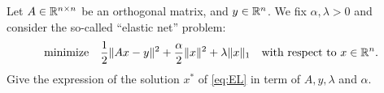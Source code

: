 \documentclass[11pt,nocut]{article}
\begin{document}
\vspace{4mm}

\begin{problem}[$\star$]
	Let $A \in \mathbb{R}^{n \times n}$ be an orthogonal matrix, and $y \in \mathbb{R}^n$. We fix $\alpha,\lambda> 0$ and consider the so-called ``elastic net'' problem:
	\begin{equation}\label{eq:EL}
	\text{minimize} \quad
	\frac{1}{2} \|Ax - y\|^2 + \frac{\alpha}{2}\|x\|^2 + \lambda \|x\|_1 \quad \text{with respect to} \ x \in \mathbb{R}^n.
	\end{equation}
	Give the expression of the solution $x^*$ of \eqref{eq:EL} in term of $A,y,\lambda$ and $\alpha$.
\end{problem}

\vspace{1cm}
\centerline{}

%
%
\end{document}

